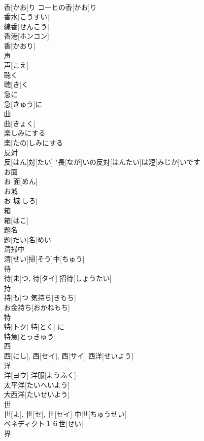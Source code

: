 \documentclass[8pt]{extreport}
\begin{document}
\begin{CJK}{UTF8}{min}
\\	香[かお]り	コーヒの香[かお]り 
\\	香水[こうすい] 
\\	線香[せんこう] 
\\	香港[ホンコン] 
\\	香[かおり] 
\\	声	
\\	声[こえ]	
\\	聴く	
\\	聴[き]く	
\\	急に	
\\	急[きゅう]に	
\\	曲	
\\	曲[きょく]	
\\	楽しみにする	
\\	楽[たの]しみにする	
\\	反対	
\\	反[はん]対[たい]	"長[なが]いの反対[はんたい]は短[みじか]いです 
\\	お面	
\\	お 面[めん]	
\\	お城	
\\	お 城[しろ]	
\\	箱	
\\	箱[はこ]	
\\	題名	
\\	題[だい]名[めい]	
\\	清掃中	
\\	清[せい]掃[そう]中[ちゅう]	
\\	待	
\\	待[ま]つ, 待[タイ]	招待[しょうたい] 
\\	持	
\\	持[も]つ	気持ち[きもち] 
\\	お金持ち[おかねもち] 
\\	特	
\\	特[トク]	特[とく] に 
\\	特急[とっきゅう] 
\\	西	
\\	西[にし], 西[セイ], 西[サイ]	西洋[せいよう] 
\\	洋	
\\	洋[ヨウ]	洋服[ようふく] 
\\	太平洋[たいへいよう] 
\\	大西洋[たいせいよう] 
\\	世	
\\	世[よ], 世[セ], 世[セイ]	中世[ちゅうせい] 
\\	ベネディクト１６世[せい] 
\\	界	

\end{CJK}
\end{document}
